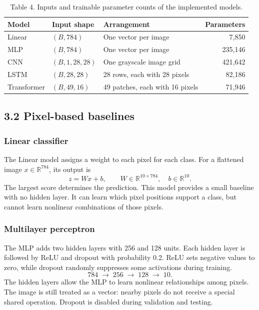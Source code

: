 \begin{table}[h]
\centering
\caption{Table 4. Inputs and trainable parameter counts of the implemented models.}
\label{tab:fresh_inputs}
\begin{tabularx}{\linewidth}{l l X r}
\toprule
Model & Input shape & Arrangement & Parameters\\
\midrule
Linear & $(B,784)$ & One vector per image & 7,850\\
MLP & $(B,784)$ & One vector per image & 235,146\\
CNN & $(B,1,28,28)$ & One grayscale image grid & 421,642\\
LSTM & $(B,28,28)$ & 28 rows, each with 28 pixels & 82,186\\
Transformer & $(B,49,16)$ & 49 patches, each with 16 pixels & 71,946\\
\bottomrule
\end{tabularx}
\end{table}

\subsection{3.2 Pixel-based baselines}
\subsubsection{Linear classifier}
The Linear model assigns a weight to each pixel for each class. For a flattened
image $x\in\mathbb{R}^{784}$, its output is
\[
z=Wx+b,\qquad W\in\mathbb{R}^{10\times784},\quad b\in\mathbb{R}^{10}.
\]
The largest score determines the prediction. This model provides a small
baseline with no hidden layer. It can learn which pixel positions support a
class, but cannot learn nonlinear combinations of those pixels.

\subsubsection{Multilayer perceptron}
The MLP adds two hidden layers with 256 and 128 units. Each hidden layer is
followed by ReLU and dropout with probability 0.2. ReLU sets negative values to
zero, while dropout randomly suppresses some activations during training.
\[
784 \;\longrightarrow\; 256 \;\longrightarrow\; 128
\;\longrightarrow\; 10.
\]
The hidden layers allow the MLP to learn nonlinear relationships among pixels.
The image is still treated as a vector: nearby pixels do not receive a special
shared operation. Dropout is disabled during validation and testing.


